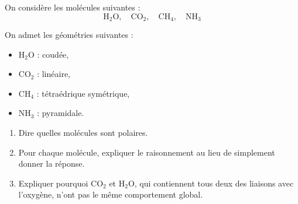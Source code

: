 \documentclass[11pt,a4paper]{article}
\begin{document}
\begin{enoncebox}
On considère les molécules suivantes :
\[
\mathrm{H_2O},\quad \mathrm{CO_2},\quad \mathrm{CH_4},\quad \mathrm{NH_3}
\]

On admet les géométries suivantes :
\begin{itemize}
    \item \(\mathrm{H_2O}\) : coudée,
    \item \(\mathrm{CO_2}\) : linéaire,
    \item \(\mathrm{CH_4}\) : tétraédrique symétrique,
    \item \(\mathrm{NH_3}\) : pyramidale.
\end{itemize}

\begin{enumerate}[label=\arabic*)]
    \item Dire quelles molécules sont polaires.
    \item Pour chaque molécule, expliquer le raisonnement au lieu de simplement donner la réponse.
    \item Expliquer pourquoi \(\mathrm{CO_2}\) et \(\mathrm{H_2O}\), qui contiennent tous deux des liaisons avec l'oxygène, n'ont pas le même comportement global.
\end{enumerate}
\end{enoncebox}
\end{document}
